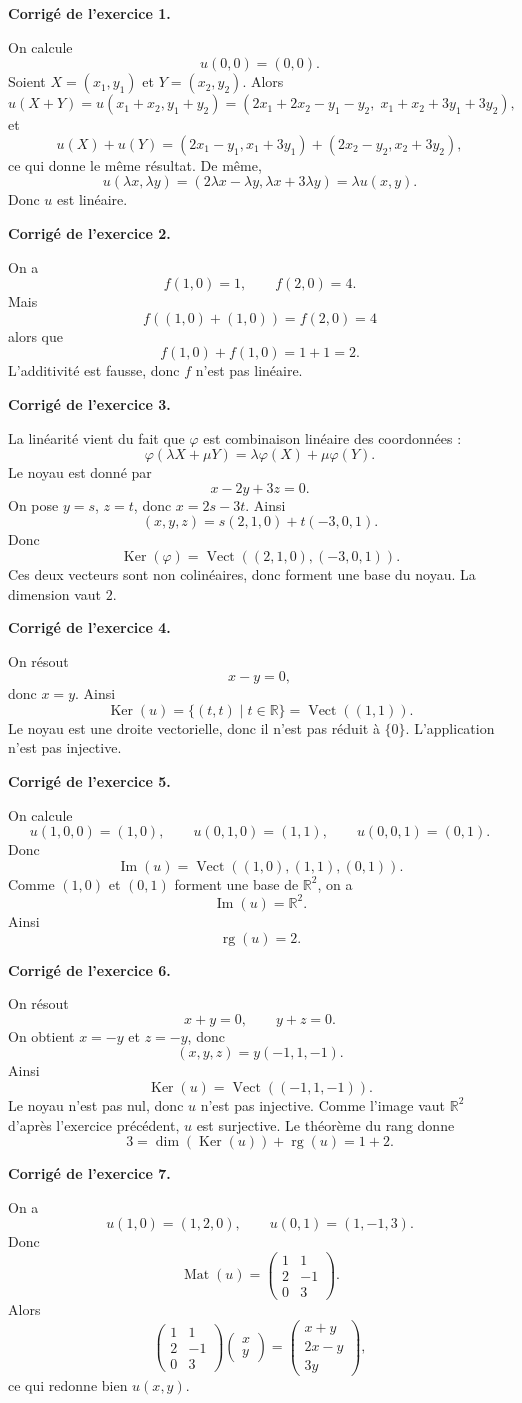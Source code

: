 \documentclass[11pt,a4paper]{article}
\newcommand{\corr}[1]{
    \vspace{0.35cm}
    \noindent\textbf{\textcolor{blue!60!black}{Corrigé de l'exercice #1.}}
    \par
}
\newcommand{\Ker}{\operatorname{Ker}}
\newcommand{\Img}{\operatorname{Im}}
\newcommand{\rg}{\operatorname{rg}}
\newcommand{\Mat}{\operatorname{Mat}}
\newcommand{\Vect}{\operatorname{Vect}}
\begin{document}
\corr{1}
On calcule
\[
u(0,0)=(0,0).
\]
Soient $X=(x_1,y_1)$ et $Y=(x_2,y_2)$. Alors
\[
u(X+Y)=u(x_1+x_2,y_1+y_2)
=(2x_1+2x_2-y_1-y_2,\;x_1+x_2+3y_1+3y_2),
\]
et
\[
u(X)+u(Y)=(2x_1-y_1,x_1+3y_1)+(2x_2-y_2,x_2+3y_2),
\]
ce qui donne le même résultat. De même,
\[
u(\lambda x,\lambda y)=(2\lambda x-\lambda y,\lambda x+3\lambda y)=\lambda u(x,y).
\]
Donc $u$ est linéaire.

\corr{2}
On a
\[
f(1,0)=1,\qquad f(2,0)=4.
\]
Mais
\[
f((1,0)+(1,0))=f(2,0)=4
\]
alors que
\[
f(1,0)+f(1,0)=1+1=2.
\]
L'additivité est fausse, donc $f$ n'est pas linéaire.

\corr{3}
La linéarité vient du fait que $\varphi$ est combinaison linéaire des coordonnées :
\[
\varphi(\lambda X+\mu Y)=\lambda\varphi(X)+\mu\varphi(Y).
\]
Le noyau est donné par
\[
x-2y+3z=0.
\]
On pose $y=s$, $z=t$, donc $x=2s-3t$. Ainsi
\[
(x,y,z)=s(2,1,0)+t(-3,0,1).
\]
Donc
\[
\Ker(\varphi)=\Vect((2,1,0),(-3,0,1)).
\]
Ces deux vecteurs sont non colinéaires, donc forment une base du noyau. La dimension vaut $2$.

\corr{4}
On résout
\[
x-y=0,
\]
donc $x=y$. Ainsi
\[
\Ker(u)=\{(t,t)\mid t\in\mathbb{R}\}=\Vect((1,1)).
\]
Le noyau est une droite vectorielle, donc il n'est pas réduit à $\{0\}$. L'application n'est pas injective.

\corr{5}
On calcule
\[
u(1,0,0)=(1,0),\qquad u(0,1,0)=(1,1),\qquad u(0,0,1)=(0,1).
\]
Donc
\[
\Img(u)=\Vect((1,0),(1,1),(0,1)).
\]
Comme $(1,0)$ et $(0,1)$ forment une base de $\mathbb{R}^2$, on a
\[
\Img(u)=\mathbb{R}^2.
\]
Ainsi
\[
\rg(u)=2.
\]

\corr{6}
On résout
\[
x+y=0,\qquad y+z=0.
\]
On obtient $x=-y$ et $z=-y$, donc
\[
(x,y,z)=y(-1,1,-1).
\]
Ainsi
\[
\Ker(u)=\Vect((-1,1,-1)).
\]
Le noyau n'est pas nul, donc $u$ n'est pas injective. Comme l'image vaut $\mathbb{R}^2$ d'après l'exercice précédent, $u$ est surjective. Le théorème du rang donne
\[
3=\dim(\Ker(u))+\rg(u)=1+2.
\]

\corr{7}
On a
\[
u(1,0)=(1,2,0),\qquad u(0,1)=(1,-1,3).
\]
Donc
\[
\Mat(u)=
\begin{pmatrix}
1&1\\
2&-1\\
0&3
\end{pmatrix}.
\]
Alors
\[
\begin{pmatrix}
1&1\\
2&-1\\
0&3
\end{pmatrix}
\begin{pmatrix}x\\y\end{pmatrix}
=
\begin{pmatrix}
x+y\\2x-y\\3y
\end{pmatrix},
\]
ce qui redonne bien $u(x,y)$.
\end{document}
